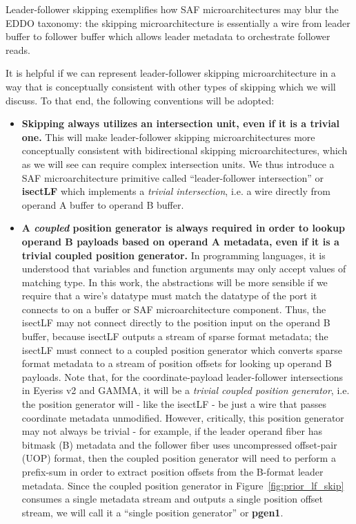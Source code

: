 Leader-follower skipping exemplifies how SAF microarchitectures may blur the EDDO taxonomy: the skipping microarchitecture is essentially a wire from leader buffer to follower buffer which allows leader metadata to orchestrate follower reads.

It is helpful if we can represent leader-follower skipping microarchitecture in a way that is conceptually consistent with other types of skipping which we will discuss. To that end, the following conventions will be adopted:

\begin{itemize}
    \item \textbf{Skipping always utilizes an intersection unit, even if it is a trivial one.} This will make leader-follower skipping microarchitectures more conceptually consistent with bidirectional skipping microarchitectures, which as we will see can require complex intersection units. We thus introduce a SAF microarchitecture primitive called ``leader-follower intersection'' or \textbf{isectLF} which implements a \textit{trivial intersection}, i.e. a wire directly from operand A buffer to operand B buffer.
    \item \textbf{A \textit{coupled} position generator is always required in order to lookup operand B payloads based on operand A metadata, even if it is a trivial coupled position generator.} In programming languages, it is understood that variables and function arguments may only accept values of matching type. In this work, the abstractions will be more sensible if we require that a wire's datatype must match the datatype of the port it connects to on a buffer or SAF microarchitecture component. Thus, the isectLF may not connect directly to the position input on the operand B buffer, because isectLF outputs a stream of sparse format metadata; the isectLF must connect to a coupled position generator which converts sparse format metadata to a stream of position offsets for looking up operand B payloads. Note that, for the coordinate-payload leader-follower intersections in Eyeriss v2\cite{eyerissv2} and GAMMA\cite{gamma}, it will be a \textit{trivial coupled position generator}, i.e. the position generator will - like the isectLF - be just a wire that passes coordinate metadata unmodified. However, critically, this position generator may not always be trivial - for example, if the leader operand fiber has bitmask (B) metadata and the follower fiber uses uncompressed offset-pair (UOP)\cite{sparseloop} format, then the coupled position generator will need to perform a prefix-sum in order to extract position offsets from the B-format leader metadata. Since the coupled position generator in Figure~\ref{fig:prior_lf_skip} consumes a single metadata stream and outputs a single position offset stream, we will call it a ``single position generator'' or \textbf{pgen1}.
\end{itemize}

